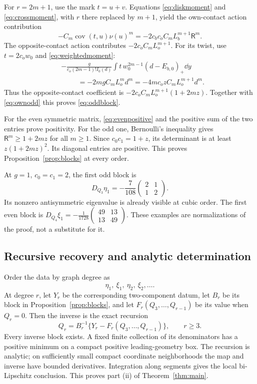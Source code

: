 For $r=2m+1$, use the mark $t=u+v$. Equations
\eqref{eq:diskmoment} and \eqref{eq:crossmoment}, with
$r$ there replaced by $m+1$, yield the own-contact action contribution
\begin{equation}\label{eq:ownodd}
 -C_m\operatorname{cov}(t,u)\nu(u)^m
       =-2c_bc_oC_mL_b^{m+1}\mathsf R^m.
\end{equation}
The opposite-contact action contributes $-2c_oC_mL_o^{m+1}$.
For its twist, use $t=2c_ow_0$ and \eqref{eq:weightedmoment}:
\begin{align*}
 &-\frac{g}{c_o(2m-1)!I_0(d)}
       \int t\,w_0^{2m-1}(d-E_{b,0})_+\dd y\\
 &\hspace{1cm}=-2m g C_mL_o^m d^m
       =-4mc_ozC_mL_o^{m+1}d^m.
\end{align*}
Thus the opposite-contact coefficient is
$-2c_oC_mL_o^{m+1}(1+2mz)$. Together with \eqref{eq:ownodd}
this proves \eqref{eq:oddblock}.

For the even symmetric matrix, \eqref{eq:evenpositive} and the
positive sum of the two entries prove positivity. For the odd one,
Bernoulli's inequality gives $\mathsf R^m\ge1+2mz$ for all
$m\ge1$. Since $c_0c_1=1+z$, its determinant is at least
$z(1+2mz)^2$. Its diagonal entries are positive. This proves
Proposition~\ref{prop:blocks} at every order.

At $g=1$, $c_0=c_1=2$, the first odd block is
\begin{equation}\label{eq:cubicexample}
 D_{Q_3}\eta_1=-\frac7{108}
                  \begin{pmatrix}2&1\\1&2\end{pmatrix}.
\end{equation}
Its nonzero antisymmetric eigenvalue is already visible at cubic
order. The first even block is
$D_{Q_4}\xi_1=-\frac1{1728}\left(\begin{smallmatrix}49&13\\13&49\end{smallmatrix}\right)$.
These examples are normalizations of the proof, not a substitute for it.

\subsection{Recursive recovery and analytic determination}
Order the data by graph degree as
\[
 \eta_1,\ \xi_1,\ \eta_2,\ \xi_2,\ldots .
\]
At degree $r$, let $Y_r$ be the corresponding two-component datum,
let $B_r$ be its block in Proposition~\ref{prop:blocks}, and let
$F_r(Q_3,\ldots,Q_{r-1})$ be its value when $Q_r=0$.
Then the inverse is the exact recursion
\begin{equation}\label{eq:recursion}
 Q_r=B_r^{-1}\{Y_r-F_r(Q_3,\ldots,Q_{r-1})\},\qquad r\ge3.
\end{equation}
Every inverse block exists. A fixed finite collection of its denominators
has a positive minimum on a compact positive leading-geometry box.
The recursion is analytic; on sufficiently small compact coordinate
neighborhoods the map and inverse have bounded derivatives. Integration
along segments gives the local bi-Lipschitz conclusion. This proves
part (ii) of Theorem~\ref{thm:main}.

